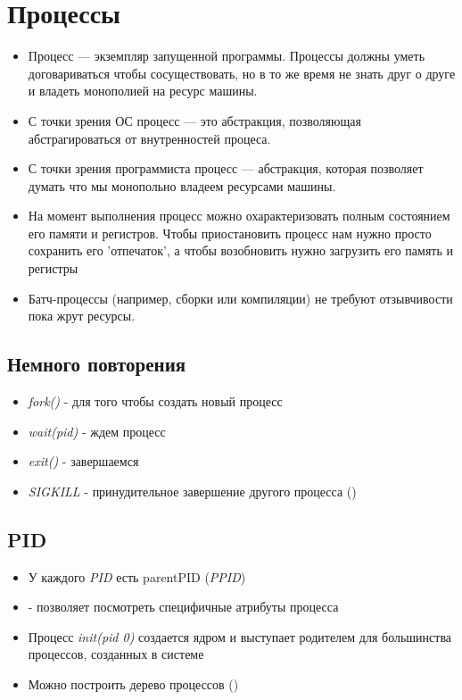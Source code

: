 \documentclass[../lectures.tex]{subfiles}
\begin{document}
\chapter{Процессы}
\begin{itemize}
    \item Процесс --- экземпляр запущенной программы. Процессы должны уметь договариваться
    чтобы сосуществовать, но в то же время не знать друг о друге и владеть
    монополией на ресурс машины. 

    \item С точки зрения ОС процесс --- это абстракция, позволяющая абстрагироваться от внутренностей процеса. 

    \item С точки зрения программиста процесс --- абстракция, 
    которая позволяет думать что мы монопольно владеем ресурсами машины.

    \item На момент выполнения процесс можно охарактеризовать полным состоянием его памяти
    и регистров. Чтобы приостановить процесс нам нужно просто сохранить его 'отпечаток', 
    а чтобы возобновить нужно загрузить его память и регистры

    \item Батч-процессы (например, сборки или компиляции) не требуют отзывчивости пока жрут ресурсы.
\end{itemize}


\section{Немного повторения}

\begin{itemize}
    \item \emph{fork()} - для того чтобы создать новый процесс
    \item \emph{wait(pid)} - ждем процесс
    \item \emph{exit()} - завершаемся
    \item \emph{SIGKILL} - принудительное завершение другого процесса ()
\end{itemize}

\section{PID}

\begin{itemize}
    \item У каждого \emph{PID} есть parentPID (\emph{PPID})

    \item {} - позволяет посмотреть специфичные атрибуты процесса

    \item Процесс \emph{init(pid 0)} создается ядром и выступает родителем для большинства процессов, созданных в системе

    \item Можно построить дерево процессов ()
\end{itemize}
\end{document}
